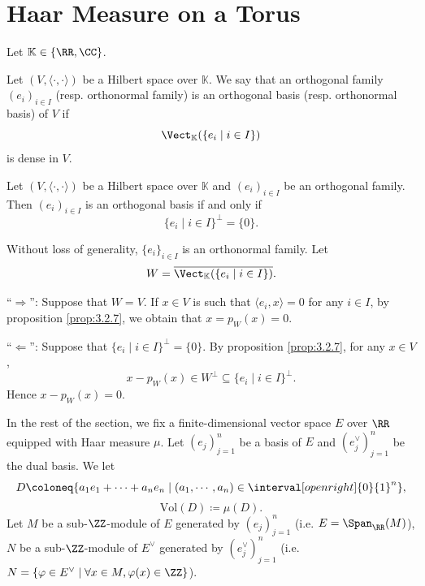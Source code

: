 \section{Haar Measure on a Torus}
Let $\mathbb{K} \in \{\RR,\CC\}$.

\begin{definitionenv}
    Let $(V,\langle \cdot,\cdot \rangle)$ be a Hilbert space over $\mathbb{K}$.
    We say that an orthogonal family $(e_i)_{i \in I}$ (resp. orthonormal family) is an orthogonal basis (resp. orthonormal basis) of $V$ if
    $$\Vect_{\mathbb{K}}(\{e_i \mid i \in I\})$$
    is dense in $V$.
\end{definitionenv}

\begin{propositionenv}
    Let $(V,\langle \cdot,\cdot \rangle)$ be a Hilbert space over $\mathbb{K}$ and $(e_i)_{i \in I}$ be an orthogonal family.
    Then $(e_i)_{i \in I}$ is an orthogonal basis if and only if
    $$\{e_i \mid i \in I\}^\perp = \{0\}.$$
\end{propositionenv}
\begin{proofenv}
    Without loss of generality, $\{e_i\}_{i \in I}$ is an orthonormal family.
    Let
    $$W = \overline{\Vect_{\mathbb{K}}(\{e_i \mid i \in I\})}.$$

    ``$\Rightarrow$'': Suppose that $W = V$.
    If $x \in V$ is such that $\langle e_i,x \rangle = 0$ for any $i \in I$, by proposition \ref{prop:3.2.7}, we obtain that $x = p_{W}(x) = 0$.

    ``$\Leftarrow$'': Suppose that $\{e_i \mid i \in I\}^{\perp} = \{0\}$.
    By proposition \ref{prop:3.2.7}, for any $x \in V$,
    $$x - p_W(x) \in W^\perp \subseteq \{e_i \mid i \in I\}^\perp.$$
    Hence $x - p_{W}(x) = 0$.
\end{proofenv}

In the rest of the section, we fix a finite-dimensional vector space $E$ over $\RR$ equipped with Haar measure $\mu$.
Let $(e_j)_{j=1}^n$ be a basis of $E$ and $(e^\vee_{j})_{j=1}^{n}$ be the dual basis.
We let
$$D \coloneq \{a_1 e_1 + \cdots + a_n e_n \mid (a_1,\cdots,a_n) \in \interval[open right]{0}{1}^n\},$$
$$\mathrm{Vol}(D) \coloneq \mu(D).$$
Let $M$ be a sub-$\ZZ$-module of $E$ generated by $(e_j)_{j=1}^n$ (i.e. $E = \Span_{\RR}(M)$), $N$ be a sub-$\ZZ$-module of $E^\vee$ generated by $(e^\vee_j)_{j=1}^{n}$ (i.e. $N = \{\varphi \in E^\vee \mid \forall x \in M, \varphi(x) \in \ZZ\}$).

